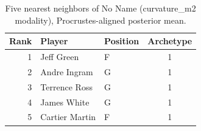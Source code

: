 \begin{table}[htbp]
  \centering\small
  \begin{tabular}{rllc}
    \toprule
    Rank & Player & Position & Archetype \\
    \midrule
    1 & Jeff Green & F & 1 \\
    2 & Andre Ingram & G & 1 \\
    3 & Terrence Ross & G & 1 \\
    4 & James White & G & 1 \\
    5 & Cartier Martin & F & 1 \\
    \bottomrule
  \end{tabular}
  \caption{Five nearest neighbors of No Name (curvature_m2 modality), Procrustes-aligned posterior mean.}
  \label{tab:No_Name_neighbors_curvature_m2}
\end{table}

